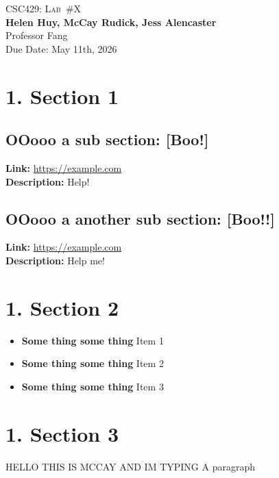 \documentclass[letterpaper]{article}
\newcommand{\labTitle}{Lab\ \#X}
\newcommand{\labDueDate}{May 11th, 2026}
\newcommand{\labClass}{CSC429}
\newcommand{\labClassTime}{}
\newcommand{\labClassInstructor}{Professor Fang}
\newcommand{\labAuthorName}{\textbf{Helen Huy, McCay Rudick, Jess Alencaster}}
\begin{document}
\thispagestyle{empty}


\vspace*{\fill}
\begin{center}
    {\Huge \scshape \labClass: \labTitle} \\ \vspace{10pt}
    {\Large \labAuthorName} \\ \vspace{5pt}
    {\large \labClassInstructor \ \labClassTime} \\ \vspace{5pt}
    {\large Due Date: \labDueDate}
\end{center} 
\vspace*{\fill}

\newpage


\section{1. Section 1}

\subsection*{OOooo a sub section: [Boo!]}
\textbf{Link:} \href{https://example.com}{https://example.com} \\
\textbf{Description:} Help!

\subsection*{OOooo a another sub section: [Boo!!]}
\textbf{Link:} \href{https://example.com}{https://example.com} \\
\textbf{Description:} Help me!


\section{1. Section 2}

\begin{itemize}[leftmargin=1.5em]
    \item \textbf{Some thing some thing} Item 1 
    \item \textbf{Some thing some thing} Item 2
    \item \textbf{Some thing some thing} Item 3
\end{itemize}


\section{1. Section 3}
HELLO THIS IS MCCAY AND IM TYPING A paragraph
\end{document}
